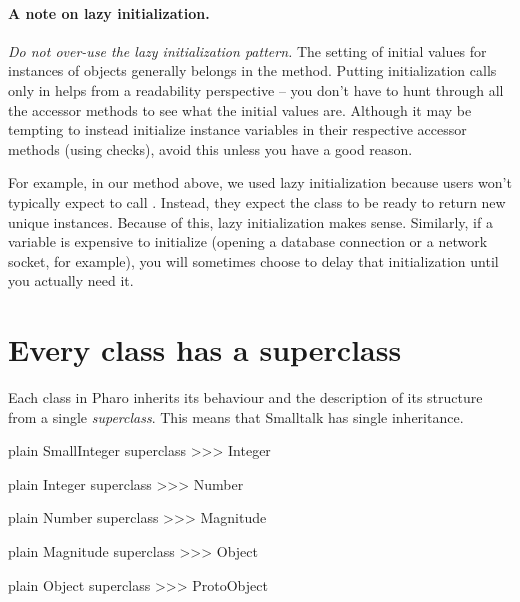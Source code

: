 \documentclass[10pt,twoside,english]{_support/latex/sbabook/sbabook}
\begin{document}
\subsubsection{A note on lazy initialization.}
\textit{Do not over-use the lazy initialization pattern.} The setting of initial
values for instances of objects generally belongs in the  method.
Putting initialization calls only in  helps from a readability
perspective -- you don't have to hunt through all the accessor methods to see
what the initial values are. Although it may be tempting to instead initialize
instance variables in their respective accessor methods (using 
checks), avoid this unless you have a good reason.

For example, in our  method above, we used lazy initialization
because users won't typically expect to call . Instead,
they expect the class to be ready to return new unique instances. Because of
this, lazy initialization makes sense. Similarly, if a variable is expensive to
initialize (opening a database connection or a network socket, for example),
you will sometimes choose to delay that initialization until you actually need
it.
\chapter{Every class has a superclass}
Each class in Pharo inherits its behaviour and the description of its
structure from a single \textit{superclass}. This means that Smalltalk has single
inheritance.

\begin{displaycode}{plain}
SmallInteger superclass
>>> Integer
\end{displaycode}

\begin{displaycode}{plain}
Integer superclass
>>> Number
\end{displaycode}

\begin{displaycode}{plain}
Number superclass
>>> Magnitude
\end{displaycode}

\begin{displaycode}{plain}
Magnitude superclass
>>> Object
\end{displaycode}

\begin{displaycode}{plain}
Object superclass
>>> ProtoObject
\end{displaycode}
\end{document}
